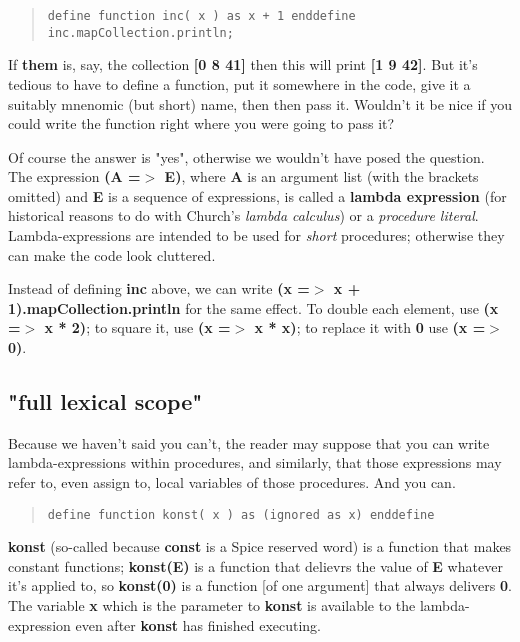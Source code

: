 \documentclass{report}
\begin{document}
\begin{quote}
\begin{verbatim}
define function inc( x ) as x + 1 enddefine
inc.mapCollection.println;
\end{verbatim}
\end{quote}


If {\bf them} is, say, the collection {\bf {[}0 8 41{]}} then this will print {\bf {[}1 9 42{]}}.
But it's tedious to have to define a function, put it
somewhere in the code, give it a suitably mnenomic (but short) name, then then
pass it. Wouldn't it be nice if you could write the function right where you
were going to pass it?

Of course the answer is "yes", otherwise we wouldn't have posed the question.
The expression {\bf (A =$>$ E)}, where {\bf A} is an argument list (with the brackets
omitted) and {\bf E} is a sequence of expressions, is called a {\bf lambda expression}
(for historical reasons to do with Church's {\em lambda calculus}) or a {\em procedure
literal}. Lambda-expressions are intended to be used for {\em short} procedures;
otherwise they can make the code look cluttered.

Instead of defining {\bf inc} above, we can write {\bf (x =$>$ x +
1).mapCollection.println} for the same effect. To double each element, use
{\bf (x =$>$ x * 2)}; to square it, use {\bf (x =$>$ x * x)}; to replace it with {\bf 0}
use {\bf (x =$>$ 0)}.

\subsection{"full lexical scope"}


Because we haven't said you can't, the reader may suppose that you can write
lambda-expressions within procedures, and similarly, that those expressions
may refer to, even assign to, local variables of those procedures. And you
can.

\begin{quote}
\begin{verbatim}
define function konst( x ) as (ignored as x) enddefine
\end{verbatim}
\end{quote}


{\bf konst} (so-called because {\bf const} is a Spice reserved word) is a function
that makes constant functions; {\bf konst(E)} is a function that delievrs the
value of {\bf E} whatever it's applied to, so {\bf konst(0)} is a function {[}of one
argument{]} that always delivers {\bf 0}. The variable {\bf x} which is the parameter to
{\bf konst} is available to the lambda-expression even after {\bf konst} has finished
executing.
\end{document}
